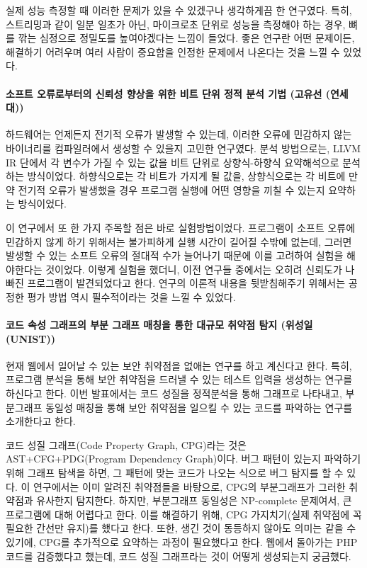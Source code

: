 \documentclass{article}
\begin{document}
실제 성능 측정할 때 이러한 문제가 있을 수 있겠구나 생각하게끔 한 연구였다.
특히, 스트리밍과 같이 일분 일초가 아닌, 마이크로초 단위로 성능을 측정해야 하는 경우, 뼈를 깎는 심정으로 정밀도를 높여야겠다는 느낌이 들었다.
좋은 연구란 어떤 문제이든, 해결하기 어려우며 여러 사람이 중요함을 인정한 문제에서 나온다는 것을 느낄 수 있었다.
\paragraph{소프트 오류로부터의 신뢰성 향상을 위한 비트 단위 정적 분석 기법 (고유선 (연세대))}
하드웨어는 언제든지 전기적 오류가 발생할 수 있는데, 이러한 오류에 민감하지 않는 바이너리를 컴파일러에서 생성할 수 있을지 고민한 연구였다.
분석 방법으로는, LLVM IR 단에서 각 변수가 가질 수 있는 값을 비트 단위로 상향식-하향식 요약해석으로 분석하는 방식이었다.
하향식으로는 각 비트가 가지게 될 값을, 상향식으로는 각 비트에 만약 전기적 오류가 발생했을 경우 프로그램 실행에 어떤 영향을 끼칠 수 있는지 요약하는 방식이었다.

이 연구에서 또 한 가지 주목할 점은 바로 실험방법이었다.
프로그램이 소프트 오류에 민감하지 않게 하기 위해서는 불가피하게 실행 시간이 길어질 수밖에 없는데, 그러면 발생할 수 있는 소프트 오류의 절대적 수가 늘어나기 때문에 이를 고려하여 실험을 해야한다는 것이었다.
이렇게 실험을 했더니, 이전 연구들 중에서는 오히려 신뢰도가 나빠진 프로그램이 발견되었다고 한다.
연구의 이론적 내용을 뒷받침해주기 위해서는 공정한 평가 방법 역시 필수적이라는 것을 느낄 수 있었다.
\paragraph{코드 속성 그래프의 부분 그래프 매칭을 통한 대규모 취약점 탐지 (위성일 (UNIST))}
현재 웹에서 일어날 수 있는 보안 취약점을 없애는 연구를 하고 계신다고 한다.
특히, 프로그램 분석을 통해 보안 취약점을 드러낼 수 있는 테스트 입력을 생성하는 연구를 하신다고 한다.
이번 발표에서는 코드 성질을 정적분석을 통해 그래프로 나타내고, 부분그래프 동일성 매칭을 통해 보안 취약점을 일으킬 수 있는 코드를 파악하는 연구를 소개한다고 한다.

코드 성질 그래프(Code Property Graph, CPG)라는 것은 AST+CFG+PDG(Program Dependency Graph)이다.
버그 패턴이 있는지 파악하기 위해 그래프 탐색을 하면, 그 패턴에 맞는 코드가 나오는 식으로 버그 탐지를 할 수 있다.
이 연구에서는 이미 알려진 취약점들을 바탕으로, CPG의 부분그래프가 그러한 취약점과 유사한지 탐지한다.
하지만, 부분그래프 동일성은 NP-complete 문제여서, 큰 프로그램에 대해 어렵다고 한다.
이를 해결하기 위해, CPG 가지치기(실제 취약점에 꼭 필요한 간선만 유지)를 했다고 한다.
또한, 생긴 것이 동등하지 않아도 의미는 같을 수 있기에, CPG를 추가적으로 요약하는 과정이 필요했다고 한다.
웹에서 돌아가는 PHP 코드를 검증했다고 했는데, 코드 성질 그래프라는 것이 어떻게 생성되는지 궁금했다.
\end{document}
